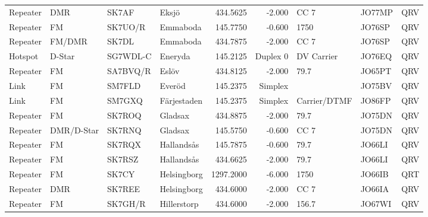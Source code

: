 \begin{landscape}
\begin{longtable}{llllrrlll}
	Repeater          & DMR             & SK7AF    & Eksjö                &     434.5625 &     -2.000 & CC 7              & JO77MP      & QRV      \\
	Repeater          & FM              & SK7UO/R  & Emmaboda             &     145.7750 &     -0.600 & 1750              & JO76SP      & QRV      \\
	Repeater          & FM/DMR          & SK7DL    & Emmaboda             &     434.7875 &     -2.000 & CC 7              & JO76SP      & QRV      \\
	Hotspot           & D-Star          & SG7WDL-C & Eneryda              &     145.2125 &   Duplex 0 & DV Carrier        & JO76EQ      & QRV      \\
	Repeater          & FM              & SA7BVQ/R & Eslöv                &     434.8125 &     -2.000 & 79.7              & JO65PT      & QRV      \\
	Link              & FM              & SM7FLD   & Everöd               &     145.2375 &    Simplex &                   & JO75BV      & QRV      \\
	Link              & FM              & SM7GXQ   & Färjestaden          &     145.2375 &    Simplex & Carrier/DTMF      & JO86FP      & QRV      \\
	Repeater          & FM              & SK7ROQ   & Gladsax              &     434.8875 &     -2.000 & 79.7              & JO75DN      & QRV      \\
	Repeater          & DMR/D-Star      & SK7RNQ   & Gladsax              &     145.5750 &     -0.600 & CC 7              & JO75DN      & QRV      \\
	Repeater          & FM              & SK7RQX   & Hallandsås           &     145.7875 &     -0.600 & 79.7              & JO66LI      & QRV      \\
	Repeater          & FM              & SK7RSZ   & Hallandsås           &     434.6625 &     -2.000 & 79.7              & JO66LI      & QRV      \\
	Repeater          & FM              & SK7CY    & Helsingborg          &    1297.2000 &     -6.000 & 1750              & JO66IB      & QRT      \\
	Repeater          & DMR             & SK7REE   & Helsingborg          &     434.6000 &     -2.000 & CC 7              & JO66IA      & QRV      \\
	Repeater          & FM              & SK7GH/R  & Hillerstorp          &     434.6000 &     -2.000 & 156.7             & JO67WI      & QRV      \\

\end{longtable}
\end{landscape}
